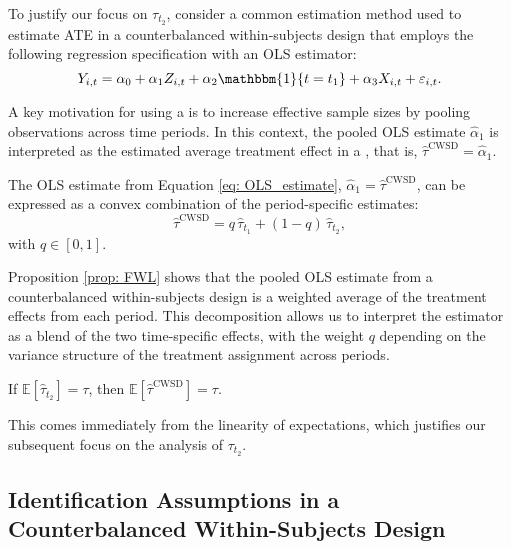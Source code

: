 To justify our focus on \(\tau_{t_2}\), consider a common estimation method used to estimate ATE in a counterbalanced within‐subjects design that employs the following regression specification with an OLS estimator:
\begin{equation}
\label{eq: OLS_estimate}
Y_{i,t} = \alpha_0 + \alpha_1 Z_{i,t} + \alpha_2 \mathbbm{1}\{t = t_1\} + \alpha_3 X_{i,t} + \varepsilon_{i,t}.
\end{equation}

A key motivation for using a \cwsd{} is to increase effective sample sizes by pooling observations across time periods. In this context, the pooled OLS estimate \(\hat{\alpha}_1\) is interpreted as the estimated average treatment effect in a \cwsd{}, that is, \(\hat{\tau}^{\text{CWSD}} = \hat{\alpha}_1\).

\begin{prop}
\label{prop: FWL}
The OLS estimate from Equation \eqref{eq: OLS_estimate}, \(\hat{\alpha}_1 = \hat{\tau}^{\text{CWSD}}\), can be expressed as a convex combination of the period-specific estimates:
\[
\hat{\tau}^{\text{CWSD}} = q\,\hat{\tau}_{t_1} + (1-q)\,\hat{\tau}_{t_2},
\]
with \(q \in [0,1]\).
\end{prop}

Proposition \ref{prop: FWL} shows that the pooled OLS estimate from a counterbalanced within-subjects design is a weighted average of the treatment effects from each period. This decomposition allows us to interpret the estimator as a blend of the two time-specific effects, with the weight \(q\) depending on the variance structure of the treatment assignment across periods.

\begin{cor}
If \(\mathbb{E}[\hat{\tau}_{t_2}] = \tau\), then \(\mathbb{E}[\hat{\tau}^{\text{CWSD}}] = \tau\).
\end{cor}

This comes immediately from the linearity of expectations, which justifies our subsequent focus on the analysis of $\tau_{t_2}$.

\subsection{Identification Assumptions in a Counterbalanced Within-Subjects Design}

